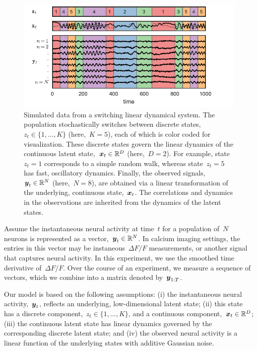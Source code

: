 \documentclass{article}
\begin{document}
\begin{figure}[t]
\centering%
\includegraphics[width=5.5in]{slds} 
\caption{Simulated data from a switching linear dynamical system.  The
  population stochastically switches between discrete states,~$z_t \in
  \{1,\ldots,K\}$ (here,~$K=5$), each of which is color coded for
  visualization.  These discrete states govern the linear dynamics of
  the continuous latent state,~$\boldsymbol{x}_t \in \mathbb{R}^D$ (here,~$D=2$). For
  example, state~$z_t=1$ corresponds to a simple random walk, whereas
  state~$z_t=5$ has fast, oscillatory dynamics. Finally, the observed
  signals,~$\boldsymbol{y}_t \in \mathbb{R}^N$ (here,~$N=8$), are obtained via a
  linear transformation of the underlying, continuous
  state,~$\boldsymbol{x}_t$. The correlations and dynamics in the observations
  are inherited from the dynamics of the latent states.}
\vspace{-0.5cm}
\label{fig:slds_ex}
\end{figure}

Assume the instantaneous neural activity at time~$t$ for a population
of~$N$ neurons is represented as a vector,~$\boldsymbol{y}_t \in \mathbb{R}^N$. In
calcium imaging settings, the entries in this vector may be
instaneous~$\Delta F/F$ measurements, or another signal that captures
neural activity. In this experiment, we use the smoothed time
derivative of~$\Delta F/F$. Over the course of an experiment, we
measure a sequence of vectors, which we combine into a matrix denoted
by~$\boldsymbol{y}_{1:T}$.

Our model is based on the following assumptions: (i) the instantaneous
neural activity,~$\boldsymbol{y}_t$, reflects an underlying, low-dimensional
latent state; (ii) this state has a discrete component,~$z_t \in \{1, \ldots, K\}$,
and a continuous component,~$\boldsymbol{x}_t \in \mathbb{R}^D$; (iii) the continuous
latent state has linear dynamics governed by the corresponding discrete
latent state; and (iv) the observed neural activity is a linear function
of the underlying states with additive Gaussian noise.  
\end{document}
